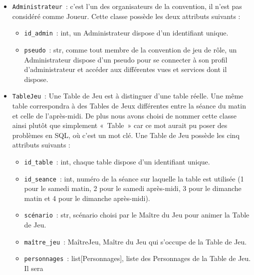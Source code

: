 \documentclass[11pt]{article}
\begin{document}
\begin{itemize}
    \item \texttt{Administrateur}~: c'est l'un des organisateurs de la convention, il n’est pas considéré comme Joueur. Cette classe possède les deux attributs suivants :
    \begin{itemize}[label=, font=\small]
        \item \texttt{id\_admin}~: int, un Administrateur dispose d'un identifiant unique.
        \item \texttt{pseudo}~: str, comme tout membre de la convention de jeu de rôle, un Administrateur dispose d'un pseudo pour se connecter à son profil d'administrateur et accéder aux différentes vues et services dont il dispose.
    \end{itemize}

    \item \texttt{TableJeu}~: Une Table de Jeu est à distinguer d'une table réelle. Une même table correspondra à des Tables de Jeux différentes entre la séance du matin et celle de l'après-midi. De plus nous avons choisi de nommer cette classe ainsi plutôt que simplement «~Table~» car ce mot aurait pu poser des problèmes en SQL, où c'est un mot clé. Une Table de Jeu possède les cinq attributs suivants :
    \begin{itemize}[label=, font=\small]
        \item \texttt{id\_table}~: int, chaque table dispose d'un  identifiant unique.
        \item \texttt{id\_seance}~: int, numéro de la séance sur laquelle la table est utilisée (1 pour le samedi matin, 2 pour le samedi après-midi, 3 pour le dimanche matin et 4 pour le dimanche après-midi).
        \item \texttt{scénario}~: str, scénario choisi par le Maître du Jeu pour animer la Table de Jeu.
        \item \texttt{maître\_jeu}~: MaîtreJeu, Maître du Jeu qui s'occupe de la Table de Jeu.
        \item \texttt{personnages}~: list[Personnages], liste des Personnages de la Table de Jeu. Il sera
    \end{itemize}
    

\end{itemize}
\end{document}
